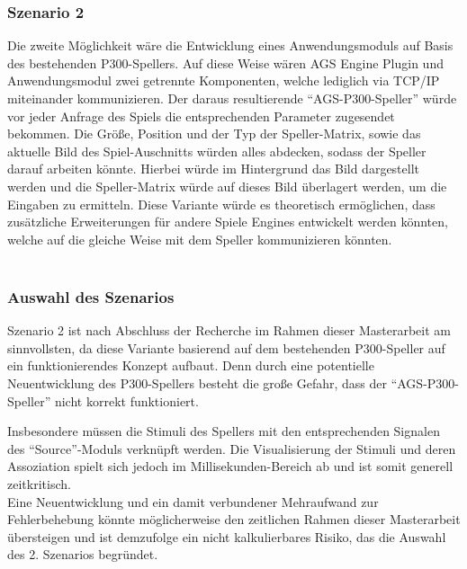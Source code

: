 \subsubsection{Szenario 2}
Die zweite Möglichkeit wäre die Entwicklung eines Anwendungsmoduls auf Basis des bestehenden P300-Spellers.
Auf diese Weise wären \acs{AGS} Engine Plugin und Anwendungsmodul zwei getrennte Komponenten, welche lediglich via TCP/IP miteinander kommunizieren.
Der daraus resultierende "`AGS-P300-Speller"' würde vor jeder Anfrage des Spiels die entsprechenden Parameter zugesendet bekommen. 
Die Größe, Position und der Typ der Speller-Matrix, sowie das aktuelle Bild des Spiel-Auschnitts würden alles abdecken, sodass der Speller darauf arbeiten könnte.
Hierbei würde im Hintergrund das Bild dargestellt werden und die Speller-Matrix würde auf dieses Bild überlagert werden, um die Eingaben zu ermitteln.
Diese Variante würde es theoretisch ermöglichen, dass zusätzliche Erweiterungen für andere Spiele Engines entwickelt werden könnten, welche auf die gleiche Weise mit dem Speller kommunizieren könnten.\\\\

\subsubsection{Auswahl des Szenarios}
Szenario 2 ist nach Abschluss der Recherche im Rahmen dieser Masterarbeit am sinnvollsten, da diese Variante basierend auf dem bestehenden P300-Speller auf ein funktionierendes Konzept aufbaut.
Denn durch eine potentielle Neuentwicklung des P300-Spellers besteht die große Gefahr, dass der "`AGS-P300-Speller"' nicht korrekt funktioniert.

Insbesondere müssen die Stimuli des Spellers mit den entsprechenden Signalen des "`Source"'-Moduls verknüpft werden.
Die Visualisierung der Stimuli und deren Assoziation spielt sich jedoch im Millisekunden-Bereich ab und ist somit generell zeitkritisch.\\

Eine Neuentwicklung und ein damit verbundener Mehraufwand zur Fehlerbehebung könnte möglicherweise den zeitlichen Rahmen dieser Masterarbeit übersteigen 
und ist demzufolge ein nicht kalkulierbares Risiko, das die Auswahl des 2. Szenarios begründet.\\







\pagebreak
